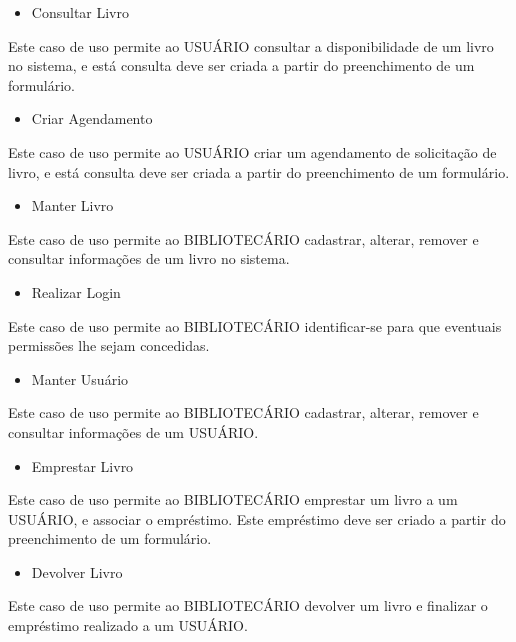 \begin{itemize}
\item{Consultar Livro}
\end{itemize}

Este caso de uso permite ao USUÁRIO consultar a disponibilidade de um livro no sistema, e está consulta deve ser criada a partir do preenchimento de um formulário.

\begin{itemize}
\item{Criar Agendamento}
\end{itemize}

Este caso de uso permite ao USUÁRIO criar um agendamento de solicitação de livro, e está consulta deve ser criada a partir do preenchimento de um formulário.

\begin{itemize}
\item{Manter Livro}
\end{itemize}

Este caso de uso permite ao BIBLIOTECÁRIO cadastrar, alterar, remover e consultar informações de um livro no sistema.

\begin{itemize}
\item{Realizar Login}
\end{itemize}

Este caso de uso permite ao BIBLIOTECÁRIO identificar-se para que eventuais permissões lhe sejam concedidas.

\begin{itemize}
\item{Manter Usuário}
\end{itemize}

Este caso de uso permite ao BIBLIOTECÁRIO cadastrar, alterar, remover e consultar informações de um USUÁRIO.

\begin{itemize}
\item{Emprestar Livro}
\end{itemize}

Este caso de uso permite ao BIBLIOTECÁRIO emprestar um livro a um USUÁRIO, e associar o empréstimo. Este empréstimo deve ser criado a partir do preenchimento de um formulário. 

\begin{itemize}
\item{Devolver Livro}
\end{itemize}

Este caso de uso permite ao BIBLIOTECÁRIO devolver um livro e finalizar o empréstimo realizado a um USUÁRIO. 

